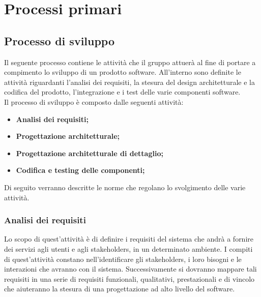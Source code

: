 \section{Processi primari}
\label{processiprimari}

\subsection{Processo di sviluppo}
\label{processosviluppo}
Il seguente processo contiene le attività che il gruppo \authorName{} attuerà al fine di portare a compimento lo sviluppo di un prodotto software. All'interno sono definite le attività riguardanti l'analisi dei requisiti, la stesura del design architetturale e la codifica del prodotto, l'integrazione e i test delle varie componenti software.\\
Il processo di sviluppo è composto dalle seguenti attività:
\begin{itemize}
\item\textbf{Analisi dei requisiti;}
\item\textbf{Progettazione architetturale;}
\item\textbf{Progettazione architetturale di dettaglio;}
\item\textbf{Codifica e testing delle componenti;}
\end{itemize}
Di seguito verranno descritte le norme che regolano lo svolgimento delle varie attività.

\subsubsection{Analisi dei requisiti}
\label{analisideirequisiti}
Lo scopo di quest'attività è di definire i requisiti del sistema che andrà a fornire dei servizi agli utenti e agli stakeholders, in un determinato ambiente. I compiti di quest'attività constano nell'identificare gli stakeholders, i loro bisogni e le interazioni che avranno con il sistema. Successivamente si dovranno mappare tali requisiti in una serie di requisiti funzionali, qualitativi, prestazionali e di vincolo che aiuteranno la stesura di una progettazione ad alto livello del software.


